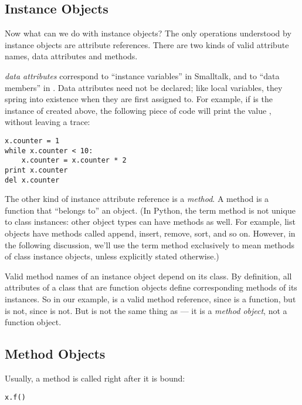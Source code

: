 \documentclass{manual}
\begin{document}
\subsection{Instance Objects \label{instanceObjects}}

Now what can we do with instance objects?  The only operations
understood by instance objects are attribute references.  There are
two kinds of valid attribute names, data attributes and methods.

\emph{data attributes} correspond to
``instance variables'' in Smalltalk, and to ``data members'' in
\Cpp.  Data attributes need not be declared; like local variables,
they spring into existence when they are first assigned to.  For
example, if  is the instance of  created above,
the following piece of code will print the value , without
leaving a trace:

\begin{verbatim}
x.counter = 1
while x.counter < 10:
    x.counter = x.counter * 2
print x.counter
del x.counter
\end{verbatim}

The other kind of instance attribute reference is a \emph{method}.
A method is a function that ``belongs to'' an
object.  (In Python, the term method is not unique to class instances:
other object types can have methods as well.  For example, list objects have
methods called append, insert, remove, sort, and so on.  However,
in the following discussion, we'll use the term method exclusively to mean
methods of class instance objects, unless explicitly stated otherwise.)

Valid method names of an instance object depend on its class.  By
definition, all attributes of a class that are function 
objects define corresponding methods of its instances.  So in our
example,  is a valid method reference, since
 is a function, but  is not, since
 is not.  But  is not the same thing as
 --- it is a \emph{method object}, not
a function object.


\subsection{Method Objects \label{methodObjects}}

Usually, a method is called right after it is bound:

\begin{verbatim}
x.f()
\end{verbatim}
\end{document}
